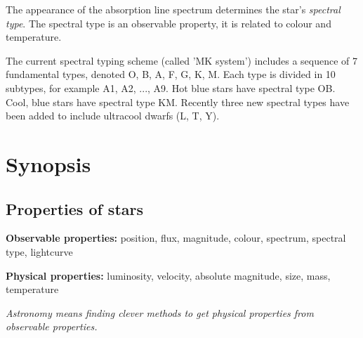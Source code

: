 The appearance of the absorption line spectrum determines the star's \textit{spectral type}. The spectral type is an observable property, it is related to colour and temperature.

The current spectral typing scheme (called 'MK system') includes a sequence of 7 fundamental types, denoted O, B, A, F, G, K, M. Each type is divided in 10 subtypes, for example A1, A2, ..., A9. Hot blue stars have spectral type OB. Cool, blue stars have spectral type KM. Recently three new spectral types have been added to include ultracool dwarfs (L, T, Y).

\section{Synopsis}

\subsection{Properties of stars}

\textbf{Observable properties:} position, flux, magnitude, colour, spectrum, spectral type, lightcurve

\textbf{Physical properties:} luminosity, velocity, absolute magnitude, size, mass, temperature

\textit{Astronomy means finding clever methods to get physical properties from observable properties.}

